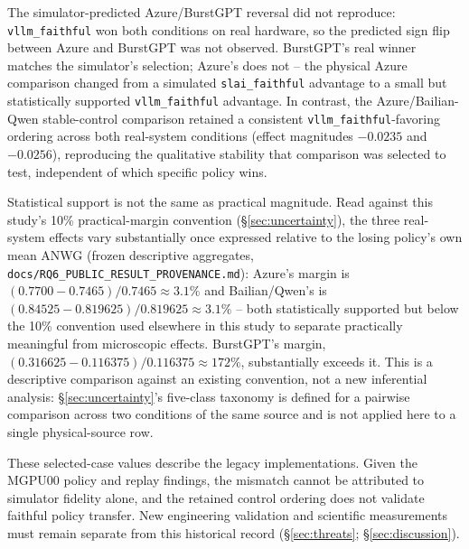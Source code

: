 The simulator-predicted Azure/BurstGPT reversal did not reproduce: \texttt{vllm\_faithful} won both conditions on real hardware, so the predicted sign flip between Azure and BurstGPT was not observed. BurstGPT's real winner matches the simulator's selection; Azure's does not -- the physical Azure comparison changed from a simulated \texttt{slai\_faithful} advantage to a small but statistically supported \texttt{vllm\_faithful} advantage. In contrast, the Azure/Bailian-Qwen stable-control comparison retained a consistent \texttt{vllm\_faithful}-favoring ordering across both real-system conditions (effect magnitudes $-0.0235$ and $-0.0256$), reproducing the qualitative stability that comparison was selected to test, independent of which specific policy wins.

Statistical support is not the same as practical magnitude. Read against
this study's 10\% practical-margin convention (\S\ref{sec:uncertainty}),
the three real-system effects vary substantially once expressed relative
to the losing policy's own mean ANWG (frozen descriptive aggregates,
\texttt{docs/RQ6\_PUBLIC\_RESULT\_PROVENANCE.md}): Azure's margin is
$(0.7700-0.7465)/0.7465 \approx 3.1\%$ and Bailian/Qwen's is
$(0.84525-0.819625)/0.819625 \approx 3.1\%$ -- both statistically
supported but below the 10\% convention used elsewhere in this study to
separate practically meaningful from microscopic effects. BurstGPT's
margin, $(0.316625-0.116375)/0.116375 \approx 172\%$, substantially
exceeds it. This is a descriptive comparison against an existing
convention, not a new inferential analysis: \S\ref{sec:uncertainty}'s
five-class taxonomy is defined for a pairwise comparison across two
conditions of the same source and is not applied here to a single
physical-source row.

These selected-case values describe the legacy implementations. Given the
MGPU00 policy and replay findings, the mismatch cannot be attributed to
simulator fidelity alone, and the retained control ordering does not validate
faithful policy transfer. New engineering validation and scientific
measurements must remain separate from this historical record
(\S\ref{sec:threats}; \S\ref{sec:discussion}).
